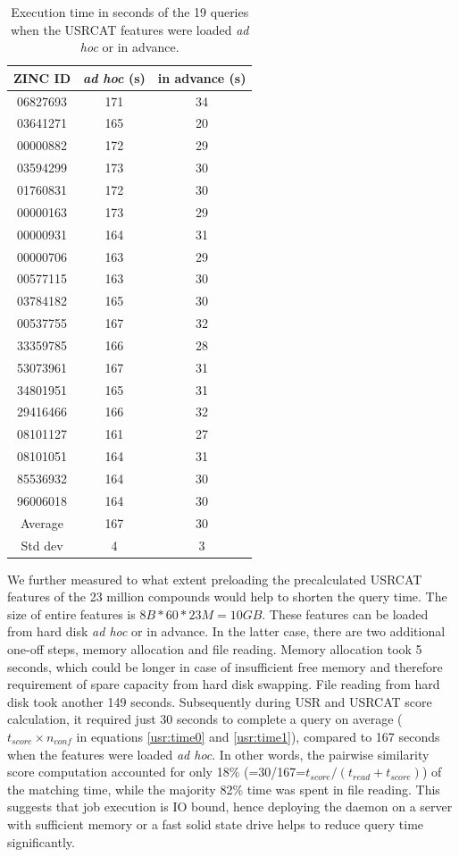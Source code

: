 \begin{table}
\caption{Execution time in seconds of the 19 queries when the USRCAT features were loaded \textit{ad hoc} or in advance.}
\label{usr:ExecutionTime}
\begin{tabular}{ccc}
\hline
ZINC ID  & \textit{ad hoc} (s) & in advance (s)\\
\hline
06827693 & 171 & 34\\
03641271 & 165 & 20\\
00000882 & 172 & 29\\
03594299 & 173 & 30\\
01760831 & 172 & 30\\
00000163 & 173 & 29\\
00000931 & 164 & 31\\
00000706 & 163 & 29\\
00577115 & 163 & 30\\
03784182 & 165 & 30\\
00537755 & 167 & 32\\
33359785 & 166 & 28\\
53073961 & 167 & 31\\
34801951 & 165 & 31\\
29416466 & 166 & 32\\
08101127 & 161 & 27\\
08101051 & 164 & 31\\
85536932 & 164 & 30\\
96006018 & 164 & 30\\
\hline
 Average & 167 & 30\\
 Std dev &   4 &  3\\
\hline
\end{tabular}
\end{table}

We further measured to what extent preloading the precalculated USRCAT features of the 23 million compounds would help to shorten the query time. The size of entire features is $8B*60*23M=10GB$. These features can be loaded from hard disk \textit{ad hoc} or in advance. In the latter case, there are two additional one-off steps, memory allocation and file reading. Memory allocation took 5 seconds, which could be longer in case of insufficient free memory and therefore requirement of spare capacity from hard disk swapping. File reading from hard disk took another 149 seconds. Subsequently during USR and USRCAT score calculation, it required just 30 seconds to complete a query on average ($t_{score}\times n_{conf}$ in equations \eqref{usr:time0} and \eqref{usr:time1}), compared to 167 seconds when the features were loaded \textit{ad hoc}. In other words, the pairwise similarity score computation accounted for only 18\% (=30/167=$t_{score}/(t_{read}+t_{score})$) of the matching time, while the majority 82\% time was spent in file reading. This suggests that job execution is IO bound, hence deploying the daemon on a server with sufficient memory or a fast solid state drive helps to reduce query time significantly.

